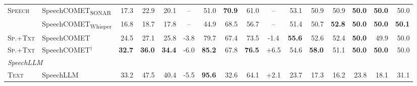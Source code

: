 \begin{table}[t]
\begin{tabular}{ll|rrrc|rrrc|rrr|rrr}
\multirow{2}{*}{\textsc{Speech}} & SpeechCOMET\textsubscript{SONAR} & \cellcolor[RGB]{253,254,254}17.3 & \cellcolor[RGB]{247,251,251}22.9 & \cellcolor[RGB]{249,252,252}20.1 & -- & \cellcolor[RGB]{246,251,251}51.0 & \cellcolor[RGB]{206,234,233}\textbf{70.9} & \cellcolor[RGB]{244,250,250}61.0 & -- & \cellcolor[RGB]{253,235,221}53.1 & \cellcolor[RGB]{254,248,244}50.9 & \cellcolor[RGB]{254,242,233}50.9 & \cellcolor[RGB]{255,255,255}\textbf{50.0} & \cellcolor[RGB]{255,255,255}\textbf{50.0} & \cellcolor[RGB]{255,255,255}50.0 \\
 & SpeechCOMET\textsubscript{Whisper} & \cellcolor[RGB]{255,255,255}16.8 & \cellcolor[RGB]{255,255,255}18.7 & \cellcolor[RGB]{255,255,255}17.8 & -- & \cellcolor[RGB]{254,254,254}44.9 & \cellcolor[RGB]{209,235,235}68.5 & \cellcolor[RGB]{253,254,254}56.7 & -- & \cellcolor[RGB]{254,246,240}51.4 & \cellcolor[RGB]{254,250,246}50.7 & \cellcolor[RGB]{252,216,188}\textbf{52.8} & \cellcolor[RGB]{255,255,255}\textbf{50.0} & \cellcolor[RGB]{255,255,255}\textbf{50.0} & \cellcolor[RGB]{232,168,205}\textbf{50.1} \\
\textsc{Sp.+Txt} & SpeechCOMET & \cellcolor[RGB]{231,244,244}24.5 & \cellcolor[RGB]{240,248,248}27.1 & \cellcolor[RGB]{237,247,247}25.8 & \cellcolor[RGB]{230,238,247}\scriptsize{-3.8} & \cellcolor[RGB]{205,233,233}79.7 & \cellcolor[RGB]{211,236,235}67.4 & \cellcolor[RGB]{216,238,238}73.5 & \cellcolor[RGB]{213,227,241}\scriptsize{-1.4} & \cellcolor[RGB]{252,220,195}\textbf{55.6} & \cellcolor[RGB]{253,237,224}52.6 & \cellcolor[RGB]{252,222,198}52.4 & \cellcolor[RGB]{255,255,255}\textbf{50.0} & \cellcolor[RGB]{255,255,255}49.9 & \cellcolor[RGB]{255,255,255}50.0 \\
\midrule
\textsc{Sp.+Txt} & SpeechCOMET$^\dagger$ & \cellcolor[RGB]{205,233,233}\textbf{32.7} & \cellcolor[RGB]{225,242,241}\textbf{36.0} & \cellcolor[RGB]{218,239,238}\textbf{34.4} & \cellcolor[RGB]{246,249,252}\scriptsize{-6.0} & \cellcolor[RGB]{198,230,230}\textbf{85.2} & \cellcolor[RGB]{210,235,235}67.8 & \cellcolor[RGB]{210,235,235}\textbf{76.5} & \cellcolor[RGB]{156,190,223}\scriptsize{+6.5} & \cellcolor[RGB]{253,226,205}54.6 & \cellcolor[RGB]{251,201,162}\textbf{58.0} & \cellcolor[RGB]{253,239,228}51.1 & \cellcolor[RGB]{255,255,255}\textbf{50.0} & \cellcolor[RGB]{255,255,255}\textbf{50.0} & \cellcolor[RGB]{255,255,255}50.0 \\
\midrule
\multicolumn{16}{l}{\textit{SpeechLLM}} \\
\midrule
\multirow{2}{*}{\textsc{Text}} & SpeechLLM & \cellcolor[RGB]{203,233,232}33.2 & \cellcolor[RGB]{205,233,233}47.5 & \cellcolor[RGB]{204,233,233}40.4 & \cellcolor[RGB]{243,247,251}\scriptsize{-5.5} & \cellcolor[RGB]{183,224,223}\textbf{95.6} & \cellcolor[RGB]{255,255,255}32.6 & \cellcolor[RGB]{237,247,247}64.1 & \cellcolor[RGB]{188,211,233}\scriptsize{+2.1} & \cellcolor[RGB]{255,255,255}23.7 & \cellcolor[RGB]{255,255,255}17.3 & \cellcolor[RGB]{255,255,255}16.2 & \cellcolor[RGB]{255,255,255}23.8 & \cellcolor[RGB]{255,255,255}18.1 & \cellcolor[RGB]{255,255,255}31.1 \\

\end{tabular}
\end{table}
